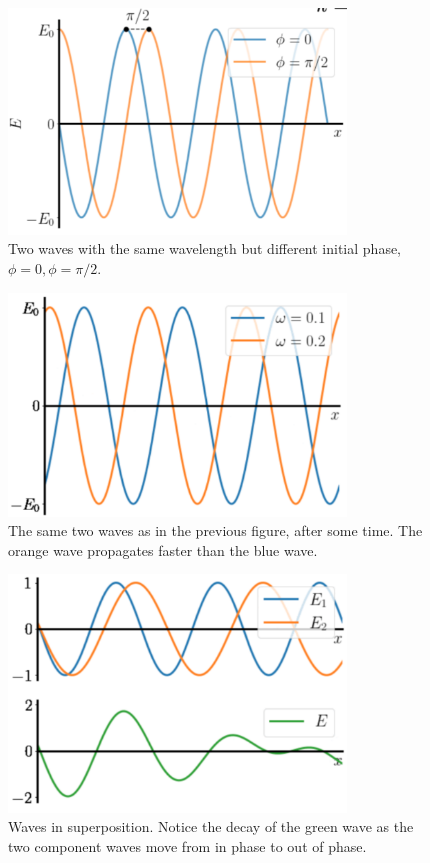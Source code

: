 \begin{figure}[H]
   \centering
    \includegraphics[width=0.8\textwidth]{lesson6/phi.pdf}
        \caption{Two waves with the same wavelength but different initial phase, $\phi = 0, \phi = \pi / 2$.}
    \label{fig:phase-diff-waves}
\end{figure}

\begin{figure}[H]
   \centering
    \includegraphics[width=0.8\textwidth]{lesson6/w.pdf}
        \caption{The same two waves as in the previous figure, after some time.  The orange wave propagates faster than the blue wave.}
    \label{fig:propagating-waves}    
\end{figure}

\begin{figure}[H]
   \centering
    \includegraphics[width=0.8\textwidth]{lesson6/wave_superposition.pdf}    
        \caption{Waves in superposition. Notice the decay of the green wave as the two component waves move from in phase to out of phase.}
    \label{fig:decaying-superposition}    
\end{figure}

